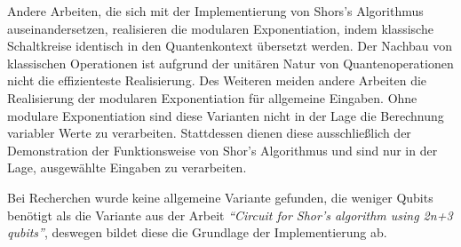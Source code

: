 Andere Arbeiten, die sich mit der Implementierung von Shors's Algorithmus auseinandersetzen,
realisieren die modularen Exponentiation, 
indem klassische Schaltkreise identisch in den Quantenkontext übersetzt werden.
Der Nachbau von klassischen Operationen ist aufgrund der unitären Natur von Quantenoperationen nicht die effizienteste Realisierung.
Des Weiteren meiden andere Arbeiten die Realisierung der modularen Exponentiation für allgemeine Eingaben. 
Ohne modulare Exponentiation sind diese Varianten nicht in der Lage die Berechnung variabler Werte zu verarbeiten.
Stattdessen dienen diese ausschließlich der Demonstration der Funktionsweise von Shor's Algorithmus und
sind nur in der Lage, ausgewählte Eingaben zu verarbeiten.

Bei Recherchen wurde keine allgemeine Variante gefunden,
die weniger Qubits benötigt als die Variante aus der Arbeit \textit{"`Circuit for Shor’s algorithm using 2n+3 qubits"'},
deswegen bildet diese die Grundlage der Implementierung ab.
















